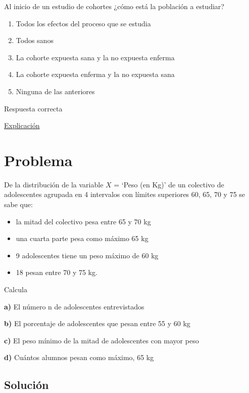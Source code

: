 \documentclass[
]{book}
\providecommand{\tightlist}{%
  \setlength{\itemsep}{0pt}\setlength{\parskip}{0pt}}
\begin{document}
Al inicio de un estudio de cohortes ¿cómo está la población a estudiar?

\begin{enumerate}
\def\labelenumi{\alph{enumi})}
\tightlist
\item
  Todos los efectos del proceso que se estudia
\item
  Todos sanos
\item
  La cohorte expuesta sana y la no expuesta enferma
\item
  La cohorte expuesta enferma y la no expuesta sana
\item
  Ninguna de las anteriores
\end{enumerate}

Respuesta correcta

\href{https://es.wikipedia.org/wiki/Estudio_de_cohorte}{Explicación}

\hypertarget{problema-1}{%
\section{Problema}\label{problema-1}}

De la distribución de la variable \(X\) = `Peso (en Kg)' de un colectivo de adolescentes agrupada en 4 intervalos con límites superiores 60, 65, 70 y 75 se sabe que:

\begin{itemize}
\tightlist
\item
  la mitad del colectivo pesa entre 65 y 70 kg
\item
  una cuarta parte pesa como máximo 65 kg
\item
  9 adolescentes tiene un peso máximo de 60 kg
\item
  18 pesan entre 70 y 75 kg.
\end{itemize}

Calcula

\textbf{a)} El número n de adolescentes entrevistados

\textbf{b)} El porcentaje de adolescentes que pesan entre 55 y 60 kg

\textbf{c)} El peso mínimo de la mitad de adolescentes con mayor peso

\textbf{d) } Cuántos alumnos pesan como máximo, 65 kg

\hypertarget{soluciuxf3n-1}{%
\subsection{Solución}\label{soluciuxf3n-1}}
\end{document}
